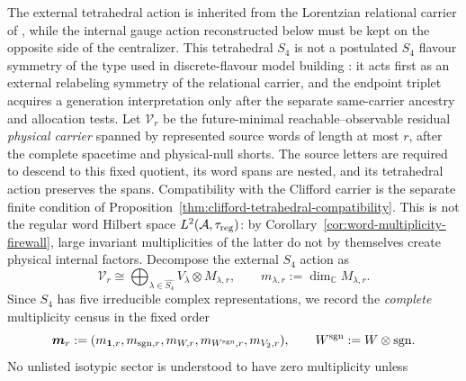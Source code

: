\documentclass[11pt]{article}
\numberwithin{equation}{section}
\theoremstyle{definition}
\theoremstyle{remark}
\newcommand{\C}{\mathbb C}
\newcommand{\A}{\mathcal A}
\begin{document}
The external tetrahedral action is inherited from the Lorentzian relational
carrier of \cite{PelissierSpacetime2026}, while the internal gauge action
reconstructed below must be kept on the opposite side of the centralizer.
This tetrahedral $S_4$ is not a postulated $S_4$ flavour symmetry of the type
used in discrete-flavour model building \cite{AltarelliFeruglio2010}: it acts
first as an external relabeling symmetry of the relational carrier, and the
endpoint triplet acquires a generation interpretation only after the separate
same-carrier ancestry and allocation tests.
Let $\mathcal V_r$ be the future-minimal
reachable--observable residual \emph{physical carrier} spanned by represented
source words of length at most $r$, after the complete spacetime and
physical-null shorts.  The source letters are required to descend to this fixed quotient, its
word spans are nested, and its tetrahedral action preserves the spans.
Compatibility with the Clifford carrier is the separate finite condition of
Proposition~\ref{thm:clifford-tetrahedral-compatibility}.  This is not the regular word Hilbert space
$L^2(\A,\tau_{\rm reg})$: by Corollary~\ref{cor:word-multiplicity-firewall},
large invariant multiplicities of the latter do not by themselves create
physical internal factors.  Decompose the external $S_4$ action as
\begin{equation}
\mathcal V_r
\cong
\bigoplus_{\lambda\in\widehat{S_4}}
V_\lambda\otimes M_{\lambda,r},
\qquad
m_{\lambda,r}:=\dim_\C M_{\lambda,r}.
\label{eq:word-depth-isotypic}
\end{equation}
Since $S_4$ has five irreducible complex representations, we record the
\emph{complete} multiplicity census in the fixed order
\begin{equation}
\bm m_r
:=
(m_{\mathbf1,r},m_{{\rm sgn},r},m_{W,r},
  m_{W^{\rm sgn},r},m_{V_2,r}),
\qquad W^{\rm sgn}:=W\otimes{\rm sgn}.
\label{eq:complete-S4-census}
\end{equation}
No unlisted isotypic sector is understood to have zero multiplicity unless
\end{document}

